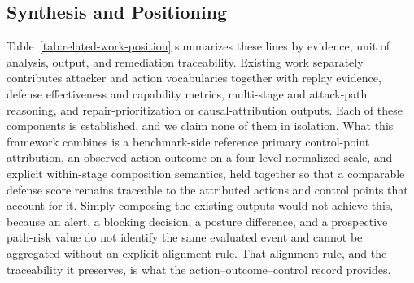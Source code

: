 \subsection{Synthesis and Positioning}
\label{subsec:rw-position}

Table~\ref{tab:related-work-position} summarizes these lines by evidence, unit of analysis, output, and remediation traceability. Existing work separately contributes attacker and action vocabularies together with replay evidence, defense effectiveness and capability metrics, multi-stage and attack-path reasoning, and repair-prioritization or causal-attribution outputs. Each of these components is established, and we claim none of them in isolation. What this framework combines is a benchmark-side reference primary control-point attribution, an observed action outcome on a four-level normalized scale, and explicit within-stage composition semantics, held together so that a comparable defense score remains traceable to the attributed actions and control points that account for it. Simply composing the existing outputs would not achieve this, because an alert, a blocking decision, a posture difference, and a prospective path-risk value do not identify the same evaluated event and cannot be aggregated without an explicit alignment rule. That alignment rule, and the traceability it preserves, is what the action--outcome--control record provides.
